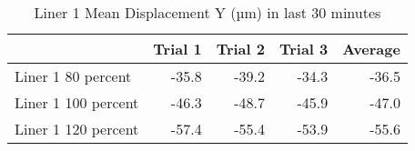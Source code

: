 \begin{table}[htbp]
\centering
\begin{tabular}{lrrrr}
\toprule
  & Trial 1 & Trial 2 & Trial 3 & Average \\
\midrule
 Liner 1 80 percent & -35.8 & -39.2 & -34.3 & -36.5 \\
 Liner 1 100 percent & -46.3 & -48.7 & -45.9 & -47.0 \\
 Liner 1 120 percent & -57.4 & -55.4 & -53.9 & -55.6 \\
\bottomrule
\end{tabular}
\caption{Liner 1 Mean Displacement Y (µm) in last 30 minutes}
\label{fig:liner_1_results_table}
\end{table}